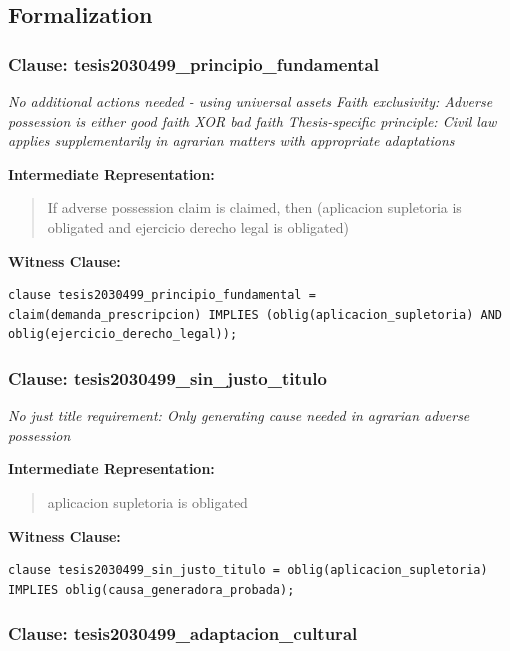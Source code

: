 \documentclass[11pt,a4paper]{article}
\begin{document}
\subsection{Formalization}

\subsubsection{Clause: tesis2030499\_principio\_fundamental}

\textit{No additional actions needed - using universal assets Faith exclusivity: Adverse possession is either good faith XOR bad faith Thesis-specific principle: Civil law applies supplementarily in agrarian matters with appropriate adaptations}

\textbf{Intermediate Representation:}

\begin{quote}
If adverse possession claim is claimed, then (aplicacion supletoria is obligated and ejercicio derecho legal is obligated)
\end{quote}

\textbf{Witness Clause:}

\begin{lstlisting}[style=witnessstyle, language=Witness]
clause tesis2030499_principio_fundamental = claim(demanda_prescripcion) IMPLIES (oblig(aplicacion_supletoria) AND oblig(ejercicio_derecho_legal));
\end{lstlisting}

\subsubsection{Clause: tesis2030499\_sin\_justo\_titulo}

\textit{No just title requirement: Only generating cause needed in agrarian adverse possession}

\textbf{Intermediate Representation:}

\begin{quote}
aplicacion supletoria is obligated
\end{quote}

\textbf{Witness Clause:}

\begin{lstlisting}[style=witnessstyle, language=Witness]
clause tesis2030499_sin_justo_titulo = oblig(aplicacion_supletoria) IMPLIES oblig(causa_generadora_probada);
\end{lstlisting}

\subsubsection{Clause: tesis2030499\_adaptacion\_cultural}
\end{document}

